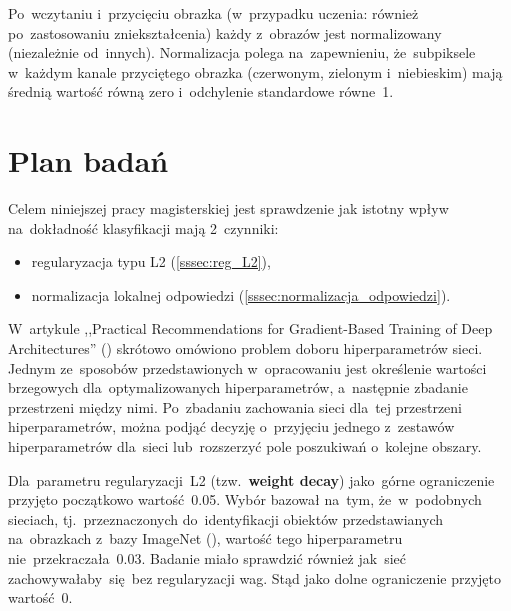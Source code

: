 Po~wczytaniu i~przycięciu obrazka (w~przypadku uczenia: również po~zastosowaniu zniekształcenia) każdy z~obrazów jest
normalizowany (niezależnie od~innych). Normalizacja polega na~zapewnieniu, że~subpiksele w~każdym kanale
przyciętego obrazka (czerwonym, zielonym i~niebieskim) mają średnią wartość równą zero i~odchylenie standardowe równe~1.

%


\section{Plan badań} \label{sec:plan-badan}
Celem niniejszej pracy magisterskiej jest sprawdzenie jak istotny wpływ na~dokładność klasyfikacji mają 2~czynniki:
\begin{itemize}
    \item regularyzacja typu L2 (\ref{sssec:reg_L2}),
    \item normalizacja lokalnej odpowiedzi (\ref{sssec:normalizacja_odpowiedzi}).
\end{itemize}

W~artykule ,,Practical Recommendations for Gradient-Based Training of Deep Architectures''
(\cite{practical-gradient-based}) skrótowo omówiono problem doboru hiperparametrów sieci. Jednym ze~sposobów
przedstawionych w~opracowaniu jest określenie wartości brzegowych dla~optymalizowanych hiperparametrów,
a~następnie zbadanie przestrzeni między nimi. Po~zbadaniu zachowania sieci dla~tej przestrzeni hiperparametrów, można podjąć
decyzję o~przyjęciu jednego z~zestawów hiperparametrów dla~sieci lub~rozszerzyć pole poszukiwań o~kolejne obszary.

Dla~parametru regularyzacji~L2 (tzw.~\textbf{weight decay}) jako~górne ograniczenie przyjęto początkowo wartość~0.05.
Wybór bazował na~tym, że~w~podobnych sieciach, tj.~przeznaczonych do~identyfikacji obiektów przedstawianych na~obrazkach
z~bazy ImageNet (\cite{imagenet}), wartość tego hiperparametru nie~przekraczała~0.03. Badanie miało sprawdzić
również jak~sieć zachowywałaby~się~bez regularyzacji wag. Stąd jako dolne ograniczenie przyjęto wartość~0.

